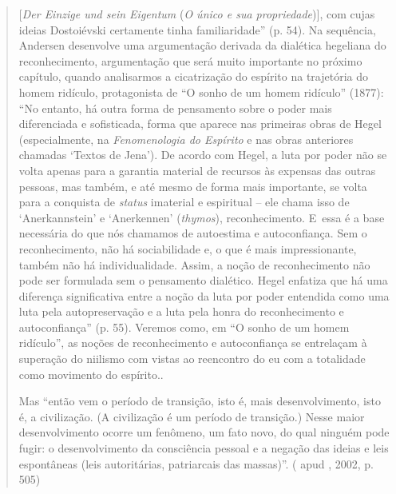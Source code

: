 {\begin{quote}
{  {[}\emph{Der Einzige und sein Eigentum} (\emph{O único e sua
  propriedade}){]}, com cujas ideias Dostoiévski certamente tinha
  familiaridade'' (p. 54). Na sequência, Andersen desenvolve uma
  argumentação derivada da dialética hegeliana do reconhecimento,
  argumentação que será muito importante no próximo capítulo, quando
  analisarmos a cicatrização do espírito na trajetória do homem
  ridículo, protagonista de ``O sonho de um homem ridículo'' (1877):
  ``No entanto, há outra forma de pensamento sobre o poder mais
  diferenciada e sofisticada, forma que aparece nas primeiras obras de
  Hegel (especialmente, na \emph{Fenomenologia do Espírito} e nas obras
  anteriores chamadas `Textos de Jena'). De acordo com Hegel, a luta por
  poder não se volta apenas para a garantia material de recursos às
  expensas das outras pessoas, mas também, e até mesmo de forma mais
  importante, se volta para a conquista de \emph{status} imaterial e
  espiritual -- ele chama isso de `Anerkannstein' e `Anerkennen'
  (\emph{thymos}), reconhecimento. E~essa é a base necessária do que nós
  chamamos de autoestima e autoconfiança. Sem o reconhecimento, não há
  sociabilidade e, o que é mais impressionante, também não há
  individualidade. Assim, a noção de reconhecimento não pode ser
  formulada sem o pensamento dialético. Hegel enfatiza que há uma
  diferença significativa entre a noção da luta por poder entendida como
  uma luta pela autopreservação e a luta pela honra do reconhecimento e
  autoconfiança'' (p. 55). Veremos como, em ``O sonho de um homem
  ridículo'', as noções de reconhecimento e autoconfiança se entrelaçam
  à superação do niilismo com vistas ao reencontro do eu com a
  totalidade como movimento do espírito.}.

Mas ``então vem o período de transição, isto é, mais desenvolvimento,
isto é, a civilização. (A civilização é um período de transição.) Nesse
maior desenvolvimento ocorre um fenômeno, um fato novo, do qual ninguém
pode fugir: o desenvolvimento da consciência pessoal e a negação das
ideias e leis espontâneas (leis autoritárias, patriarcais das massas)''.
( apud , 2002, p. 505)


\end{quote}}

